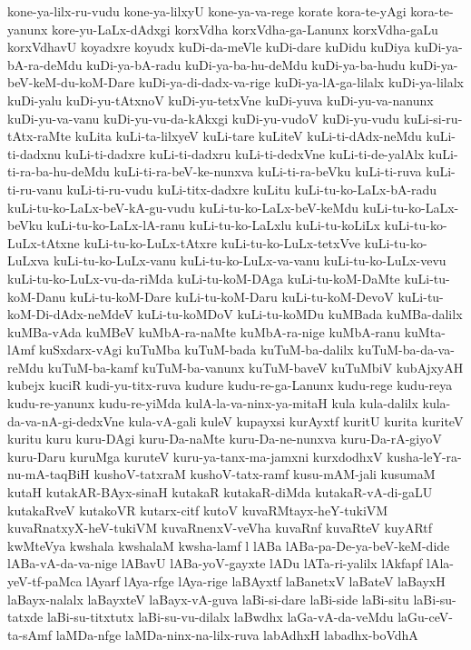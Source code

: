 {kone-ya-lilx-ru-vudu
kone-ya-lilxyU
kone-ya-va-rege
korate
kora-te-yAgi
kora-te-yanunx
kore-yu-LaLx-dAdxgi
korxVdha
korxVdha-ga-Lanunx
korxVdha-gaLu
korxVdhavU
koyadxre
koyudx
kuDi-da-meVle
kuDi-dare
kuDidu
kuDiya
kuDi-ya-bA-ra-deMdu
kuDi-ya-bA-radu
kuDi-ya-ba-hu-deMdu
kuDi-ya-ba-hudu
kuDi-ya-beV-keM-du-koM-Dare
kuDi-ya-di-dadx-va-rige
kuDi-ya-lA-ga-lilalx
kuDi-ya-lilalx
kuDi-yalu
kuDi-yu-tAtxnoV
kuDi-yu-tetxVne
kuDi-yuva
kuDi-yu-va-nanunx
kuDi-yu-va-vanu
kuDi-yu-vu-da-kAkxgi
kuDi-yu-vudoV
kuDi-yu-vudu
kuLi-si-ru-tAtx-raMte
kuLita
kuLi-ta-lilxyeV
kuLi-tare
kuLiteV
kuLi-ti-dAdx-neMdu
kuLi-ti-dadxnu
kuLi-ti-dadxre
kuLi-ti-dadxru
kuLi-ti-dedxVne
kuLi-ti-de-yalAlx
kuLi-ti-ra-ba-hu-deMdu
kuLi-ti-ra-beV-ke-nunxva
kuLi-ti-ra-beVku
kuLi-ti-ruva
kuLi-ti-ru-vanu
kuLi-ti-ru-vudu
kuLi-titx-dadxre
kuLitu
kuLi-tu-ko-LaLx-bA-radu
kuLi-tu-ko-LaLx-beV-kA-gu-vudu
kuLi-tu-ko-LaLx-beV-keMdu
kuLi-tu-ko-LaLx-beVku
kuLi-tu-ko-LaLx-lA-ranu
kuLi-tu-ko-LaLxlu
kuLi-tu-koLiLx
kuLi-tu-ko-LuLx-tAtxne
kuLi-tu-ko-LuLx-tAtxre
kuLi-tu-ko-LuLx-tetxVve
kuLi-tu-ko-LuLxva
kuLi-tu-ko-LuLx-vanu
kuLi-tu-ko-LuLx-va-vanu
kuLi-tu-ko-LuLx-vevu
kuLi-tu-ko-LuLx-vu-da-riMda
kuLi-tu-koM-DAga
kuLi-tu-koM-DaMte
kuLi-tu-koM-Danu
kuLi-tu-koM-Dare
kuLi-tu-koM-Daru
kuLi-tu-koM-DevoV
kuLi-tu-koM-Di-dAdx-neMdeV
kuLi-tu-koMDoV
kuLi-tu-koMDu
kuMBada
kuMBa-dalilx
kuMBa-vAda
kuMBeV
kuMbA-ra-naMte
kuMbA-ra-nige
kuMbA-ranu
kuMta-lAmf
kuSxdarx-vAgi
kuTuMba
kuTuM-bada
kuTuM-ba-dalilx
kuTuM-ba-da-va-reMdu
kuTuM-ba-kamf
kuTuM-ba-vanunx
kuTuM-baveV
kuTuMbiV
kubAjxyAH
kubejx
kuciR
kudi-yu-titx-ruva
kudure
kudu-re-ga-Lanunx
kudu-rege
kudu-reya
kudu-re-yanunx
kudu-re-yiMda
kulA-la-va-ninx-ya-mitaH
kula
kula-dalilx
kula-da-va-nA-gi-dedxVne
kula-vA-gali
kuleV
kupayxsi
kurAyxtf
kuritU
kurita
kuriteV
kuritu
kuru
kuru-DAgi
kuru-Da-naMte
kuru-Da-ne-nunxva
kuru-Da-rA-giyoV
kuru-Daru
kuruMga
kuruteV
kuru-ya-tanx-ma-jamxni
kurxdodhxV
kusha-leY-ra-nu-mA-taqBiH
kushoV-tatxraM
kushoV-tatx-ramf
kusu-mAM-jali
kusumaM
kutaH
kutakAR-BAyx-sinaH
kutakaR
kutakaR-diMda
kutakaR-vA-di-gaLU
kutakaRveV
kutakoVR
kutarx-citf
kutoV
kuvaRMtayx-heY-tukiVM
kuvaRnatxyX-heV-tukiVM
kuvaRnenxV-veVha
kuvaRnf
kuvaRteV
kuyARtf
kwMteVya
kwshala
kwshalaM
kwsha-lamf
l
lABa
lABa-pa-De-ya-beV-keM-dide
lABa-vA-da-va-nige
lABavU
lABa-yoV-gayxte
lADu
lATa-ri-yalilx
lAkfapf
lAla-yeV-tf-paMca
lAyarf
lAya-rfge
lAya-rige
laBAyxtf
laBanetxV
laBateV
laBayxH
laBayx-nalalx
laBayxteV
laBayx-vA-guva
laBi-si-dare
laBi-side
laBi-situ
laBi-su-tatxde
laBi-su-titxtutx
laBi-su-vu-dilalx
laBwdhx
laGa-vA-da-veMdu
laGu-ceV-ta-sAmf
laMDa-nfge
laMDa-ninx-na-lilx-ruva
labAdhxH
labadhx-boVdhA
}
